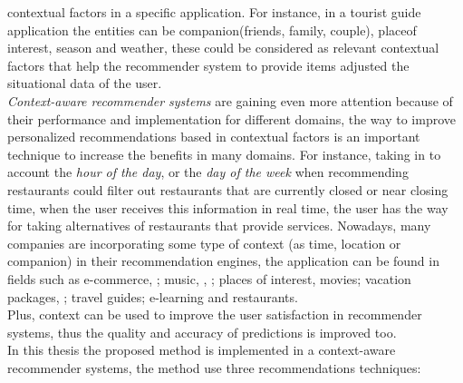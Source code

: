 contextual factors in a specific application. For instance, in a
tourist guide application the entities can be companion(friends,
family, couple), placeof interest, season and weather, these could be
considered as relevant contextual factors that help the recommender
system to provide items adjusted the situational data of the user.\\
\textit{Context-aware recommender systems} are gaining even more
attention because of their performance and implementation for
different domains, the  way to improve personalized recommendations
based in contextual factors is an important technique to increase the
benefits in  many domains. For instance, taking in to account the
\textit{hour of the day},  or the \textit{day of the week} when
recommending restaurants could  filter out restaurants that are
currently closed or near closing time, when the user receives this
information in real time, the user has the  way for taking
alternatives of restaurants that provide services. Nowadays, many
companies are incorporating some type of context (as time, location or
companion) in their recommendation engines,  the application can be
found in fields such as e-commerce\cite{schafer1999recommender},
\cite{bulander2005enabling}; music\cite{ricci2012context}, 
\cite{baltrunas2011incarmusic}, \cite{huq2010automated}; 
places of interest\cite{baltrunas2012context},
movies\cite{eyjolfsdottir2010moviegen}; vacation
packages\cite{liu2011personalized}, \cite{liu2014cocktail}; 
travel guides\cite{savage2012m}; e-learning\cite{ortigosa2010entornos} 
and restaurants\cite{chu2013chinese}.\\
Plus, context can be used to improve the user satisfaction  in
recommender systems, thus the quality and accuracy of predictions  
is improved too.\\
In this thesis the proposed method is implemented in a context-aware 
recommender systems, the method use three recommendations techniques:
